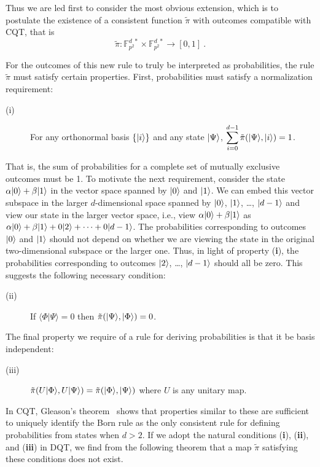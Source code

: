 \documentclass[english,12pt]{iopart}
\theoremstyle{plain}
\newcommand{\braket}[2]{\langle{#1}|{#2}\rangle}
\newcommand{\ffzd}[1]{{\mathbb{F}^{d\;*}_{#1}}}
\newcommand{\dpt}{{\tilde{\pi}}}
\begin{document}
Thus we are led first to consider the most obvious extension, which is
to postulate the existence of a consistent function $\dpt$ with
outcomes compatible with CQT, that is
\[\dpt\colon \ffzd{p^2}\times \ffzd{p^2}
\longrightarrow [0,1]\ . \]

For the outcomes of this new rule to truly be interpreted as
probabilities, the rule $\dpt$ must satisfy certain properties.
First, probabilities must satisfy a normalization requirement:
\begin{description}
\item[(i)]  For any orthonormal basis $\{{\left\vert{i}\right\rangle}\}$ and any state
  ${\left\vert{\Psi}\right\rangle}$, $\displaystyle \sum_{i=0}^{d-1} \dpt(\ket{\Psi},\ket{i})=1$.
\end{description}
That is, the sum of probabilities for a complete set of mutually
exclusive outcomes must be 1.  To motivate the next requirement,
consider the state $\alpha{\left\vert{0}\right\rangle}+\beta{\left\vert{1}\right\rangle}$ in the vector space
spanned by ${\left\vert{0}\right\rangle}$ and ${\left\vert{1}\right\rangle}$.  We can embed this vector subspace
in the larger $d$-dimensional space spanned by ${\left\vert{0}\right\rangle}$, ${\left\vert{1}\right\rangle}$,
\ldots, ${\left\vert{d-1}\right\rangle}$ and view our state in the larger vector space,
i.e., view $\alpha{\left\vert{0}\right\rangle}+\beta{\left\vert{1}\right\rangle}$ as
$\alpha{\left\vert{0}\right\rangle}+\beta{\left\vert{1}\right\rangle} + 0{\left\vert{2}\right\rangle} + \cdots+ 0{\left\vert{d-1}\right\rangle}$.  The
probabilities corresponding to outcomes ${\left\vert{0}\right\rangle}$ and ${\left\vert{1}\right\rangle}$ should
not depend on whether we are viewing the state in the original
two-dimensional subspace or the larger one. Thus, in light of property
({\bf i}), the probabilities corresponding to outcomes ${\left\vert{2}\right\rangle}$,
\ldots, ${\left\vert{d-1}\right\rangle}$ should all be zero. This suggests the following
necessary condition:
\begin{description}
\item[(ii)]
If $\braket{\Phi}{\Psi}=0$ then $\dpt(\ket{\Psi},\ket{\Phi})=0$.
\end{description}
The final property we require of a rule for deriving probabilities is
that it be basis independent:
\begin{description}
\item[(iii)]
$\dpt(U\ket{\Phi},U\ket{\Psi})=\dpt(\ket{\Phi},\ket{\Psi})$ 
where $U$ is any unitary map.
\end{description}

In CQT, Gleason's theorem~\cite{gleason1957} shows that properties
similar to these are sufficient to uniquely identify the Born rule as
the only consistent rule for defining probabilities from states when
$d>2$.  If we adopt the natural conditions ({\bf i}), ({\bf ii}), and
({\bf iii}) in DQT, we find from the following theorem that a map
$\dpt$ satisfying these conditions does not exist.
\end{document}
